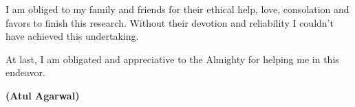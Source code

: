 \par I am obliged to my family and friends for their ethical help, love, consolation and favors to finish this research. Without their devotion and reliability I couldn't have achieved this undertaking.\\


\par At last, I am obligated and appreciative to the Almighty for helping me in this endeavor.

\vspace{1.2cm}
\begin{flushright}
	\textbf{(Atul Agarwal)}
\end{flushright}

